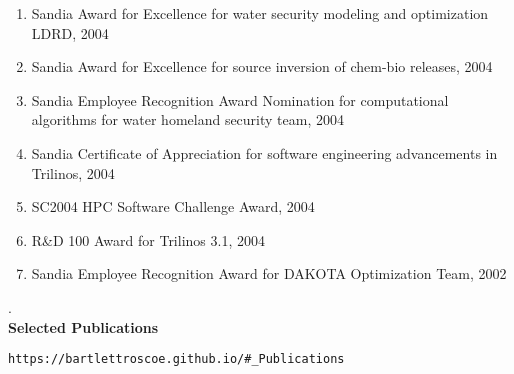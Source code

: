 \documentclass{report}
\newcommand{\sectitlevs}{1.2ex}
\newcommand{\secendvs}{1.5ex}
\newcommand{\indentone}{0.5in}
\newcommand{\widthone}{6.4in}
\newcommand{\pboxone}{\hspace*{\indentone}\parbox[t]{\widthone}}
\begin{document}
\begin{enumerate}
%
{}\item Sandia Award for Excellence for water security modeling and optimization LDRD, 2004 
%
{}\item Sandia Award for Excellence for source inversion of chem-bio releases, 2004 
%
{}\item Sandia Employee Recognition Award Nomination for computational algorithms for water homeland security team, 2004
%
{}\item Sandia Certificate of Appreciation for software engineering advancements in Trilinos, 2004 
%
{}\item SC2004 HPC Software Challenge Award, 2004
%
{}\item R\&D 100 Award for Trilinos 3.1, 2004 
%
{}\item Sandia Employee Recognition Award for DAKOTA Optimization
Team, 2002
%
\end{enumerate}
%
{\tiny .}\\[\secendvs]
%
%
{}\textbf{\Large Selected Publications} \\[\sectitlevs]
%
\pboxone{\texttt{https://bartlettroscoe.github.io/\#\_Publications}}
%
\end{document}
